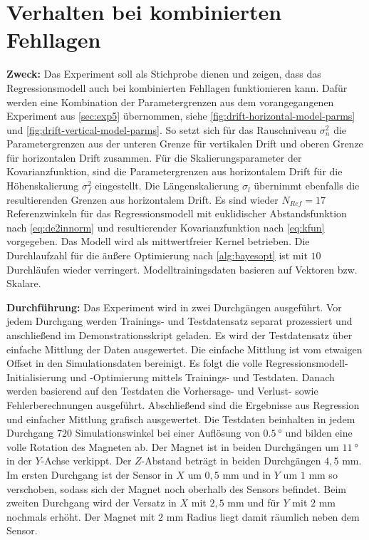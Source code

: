 %

\section{Verhalten bei kombinierten Fehllagen}\label{sec:exp6}

\textbf{Zweck:} Das Experiment soll als Stichprobe dienen und zeigen, dass das Regressionsmodell auch bei kombinierten Fehllagen funktionieren kann. Dafür werden eine Kombination der Parametergrenzen aus dem vorangegangenen Experiment aus \autoref{sec:exp5} übernommen, siehe \autoref{fig:drift-horizontal-model-parms} und \autoref{fig:drift-vertical-model-parms}. So setzt sich für das Rauschniveau $\sigma_n^2$ die Parametergrenzen aus der unteren Grenze für vertikalen Drift und oberen Grenze für horizontalen Drift zusammen. Für die Skalierungsparameter der Kovarianzfunktion, sind die Parametergrenzen aus horizontalem Drift für die Höhenskalierung $\sigma_f^2$ eingestellt. Die Längenskalierung $\sigma_l$ übernimmt ebenfalls die resultierenden Grenzen aus horizontalem Drift. Es sind wieder $N_{Ref} = 17$  Referenzwinkeln für das Regressionsmodell mit euklidischer Abstandsfunktion nach \autoref{eq:de2innorm} und resultierender Kovarianzfunktion nach \autoref{eq:kfun} vorgegeben. Das Modell wird als mittwertfreier Kernel betrieben. Die Durchlaufzahl für die äußere Optimierung nach \autoref{alg:bayesopt} ist mit $10$ Durchläufen wieder verringert. Modelltrainingsdaten basieren auf Vektoren bzw. Skalare.

\textbf{Durchführung:} Das Experiment wird in zwei Durchgängen ausgeführt. Vor jedem Durchgang werden Trainings- und Testdatensatz separat prozessiert und anschließend im Demonstrationsskript geladen. Es wird der Testdatensatz über einfache Mittlung der Daten ausgewertet. Die einfache Mittlung ist vom etwaigen Offset in den Simulationsdaten bereinigt. Es folgt die volle Regressionsmodell-Initialisierung und -Optimierung mittels Trainings- und Testdaten. Danach werden basierend auf den Testdaten die Vorhersage- und Verlust- sowie Fehlerberechnungen ausgeführt. Abschließend sind die Ergebnisse aus Regression und einfacher Mittlung grafisch ausgewertet. Die Testdaten beinhalten in jedem Durchgang $720$ Simulationswinkel bei einer Auflösung von $\SI{0,5}{\degree}$ und bilden eine volle Rotation des Magneten ab. Der Magnet ist in beiden Durchgängen um $\SI{11}{\degree}$ in der $Y$-Achse verkippt. Der $Z$-Abstand beträgt in beiden Durchgängen $4,5$ mm. Im ersten Durchgang ist der Sensor in $X$ um $0,5$ mm und in $Y$ um $1$ mm so verschoben, sodass sich der Magnet noch oberhalb des Sensors befindet. Beim zweiten Durchgang wird der Versatz in $X$ mit $2,5$ mm und für $Y$ mit $2$ mm nochmals erhöht. Der Magnet mit $2$ mm Radius liegt damit räumlich neben dem Sensor.

